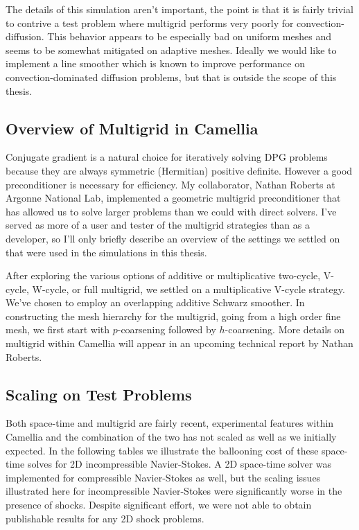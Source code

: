 \documentclass[Dissertation.tex]{subfiles}
\begin{document}
The details of this simulation aren't important, the point is that it is fairly trivial to contrive a 
test problem where multigrid performs very poorly for convection-diffusion.
This behavior appears to be especially bad on uniform meshes and seems to be somewhat mitigated on adaptive meshes.
Ideally we would like to implement a line smoother which is known to improve performance 
on convection-dominated diffusion problems, but that is outside the scope of this thesis.

\subsection{Overview of Multigrid in Camellia}
Conjugate gradient is a natural choice for iteratively solving DPG problems because they are always symmetric
(Hermitian) positive definite.
However a good preconditioner is necessary for efficiency.
My collaborator, Nathan Roberts at Argonne National Lab, implemented a geometric multigrid preconditioner
that has allowed us to solve larger problems than we could with direct solvers.
I've served as more of a user and tester of the multigrid strategies than as a developer, so
I'll only briefly describe an overview of the settings we settled on 
that were used in the simulations in this thesis.

After exploring the various options of additive or multiplicative two-cycle, V-cycle, W-cycle, or full multigrid,
we settled on a multiplicative V-cycle strategy.
We've chosen to employ an overlapping additive Schwarz smoother.
In constructing the mesh hierarchy for the multigrid, going from a high order fine mesh, we first start
with $p$-coarsening followed by $h$-coarsening.
More details on multigrid within Camellia will appear in an upcoming technical report by Nathan Roberts.

\subsection{Scaling on Test Problems}
Both space-time and multigrid are fairly recent, experimental features within Camellia
and the combination of the two has not scaled as well as we initially expected. 
In the following tables we illustrate the ballooning cost of these space-time solves 
for 2D incompressible Navier-Stokes.
A 2D space-time solver was implemented for compressible Navier-Stokes as well, but the 
scaling issues illustrated here for incompressible Navier-Stokes were significantly worse
in the presence of shocks. 
Despite significant effort, we were not able to obtain publishable results for any 2D shock problems.
\end{document}
